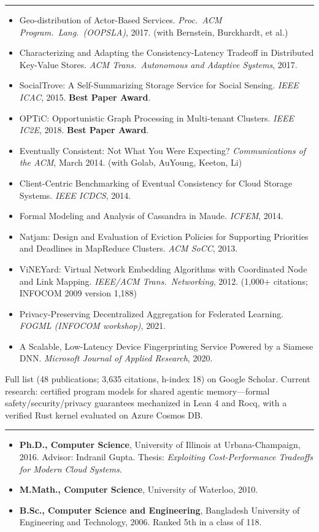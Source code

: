\documentclass[11pt]{article}
\newcommand{\cvsec}[1]{\vspace{8pt}{\large\bfseries #1}\vspace{2pt}\hrule\vspace{4pt}\par}
\begin{document}
\cvsec{Selected Publications}
\begin{itemize}[leftmargin=14pt, itemsep=1pt, topsep=2pt]
\item Geo-distribution of Actor-Based Services. \textit{Proc.\ ACM Program.\ Lang.\ (OOPSLA)}, 2017. (with Bernstein, Burckhardt, et al.)
\item Characterizing and Adapting the Consistency-Latency Tradeoff in Distributed Key-Value Stores. \textit{ACM Trans.\ Autonomous and Adaptive Systems}, 2017.
\item SocialTrove: A Self-Summarizing Storage Service for Social Sensing. \textit{IEEE ICAC}, 2015. \textbf{Best Paper Award}.
\item OPTiC: Opportunistic Graph Processing in Multi-tenant Clusters. \textit{IEEE IC2E}, 2018. \textbf{Best Paper Award}.
\item Eventually Consistent: Not What You Were Expecting? \textit{Communications of the ACM}, March 2014. (with Golab, AuYoung, Keeton, Li)
\item Client-Centric Benchmarking of Eventual Consistency for Cloud Storage Systems. \textit{IEEE ICDCS}, 2014.
\item Formal Modeling and Analysis of Cassandra in Maude. \textit{ICFEM}, 2014.
\item Natjam: Design and Evaluation of Eviction Policies for Supporting Priorities and Deadlines in MapReduce Clusters. \textit{ACM SoCC}, 2013.
\item ViNEYard: Virtual Network Embedding Algorithms with Coordinated Node and Link Mapping. \textit{IEEE/ACM Trans.\ Networking}, 2012. (1,000+ citations; INFOCOM 2009 version 1,188)
\item Privacy-Preserving Decentralized Aggregation for Federated Learning. \textit{FOGML (INFOCOM workshop)}, 2021.
\item A Scalable, Low-Latency Device Fingerprinting Service Powered by a Siamese DNN. \textit{Microsoft Journal of Applied Research}, 2020.
\end{itemize}
Full list (48 publications; 3,635 citations, h-index 18) on Google Scholar. Current research: certified program models for shared agentic memory---formal safety/security/privacy guarantees mechanized in Lean 4 and Rocq, with a verified Rust kernel evaluated on Azure Cosmos DB.

\cvsec{Education}
\begin{itemize}[leftmargin=14pt, itemsep=1pt, topsep=2pt]
\item \textbf{Ph.D., Computer Science}, University of Illinois at Urbana-Champaign, 2016. Advisor: Indranil Gupta. Thesis: \textit{Exploiting Cost-Performance Tradeoffs for Modern Cloud Systems}.
\item \textbf{M.Math., Computer Science}, University of Waterloo, 2010.
\item \textbf{B.Sc., Computer Science and Engineering}, Bangladesh University of Engineering and Technology, 2006. Ranked 5th in a class of 118.
\end{itemize}
\end{document}
